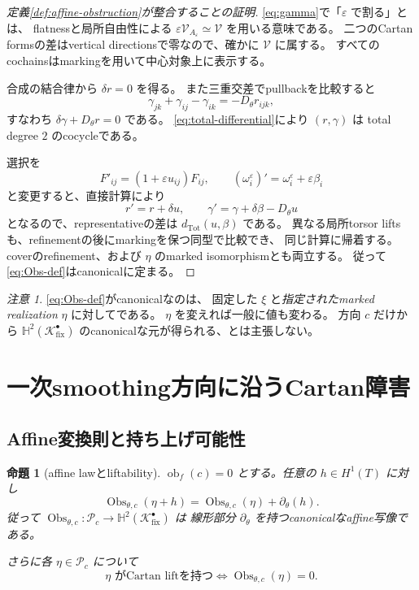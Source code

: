 \documentclass[uplatex,dvipdfmx,11pt]{jsarticle}
\numberwithin{equation}{section}
\theoremstyle{plain}
\newtheorem{proposition}[theorem]{命題}
\theoremstyle{definition}
\theoremstyle{remark}
\newtheorem{remark}[theorem]{注意}
\DeclareMathOperator{\Obs}{Obs}
\DeclareMathOperator{\obf}{ob}
\newcommand{\shV}{\mathcal V}
\newcommand{\Kfix}{\mathcal K_{\mathrm{fix}}^\bullet}
\newcommand{\Aeps}{A_\varepsilon}
\newcommand{\Hyp}{\mathbb H}
\begin{document}
\begin{proof}[定義\ref{def:affine-obstruction}が整合することの証明]
\eqref{eq:gamma}で「\(\varepsilon\) で割る」とは、
flatnessと局所自由性による \(\varepsilon\shV_{\Aeps}\simeq\shV\) を用いる意味である。
二つのCartan formsの差はvertical directionsで零なので、確かに \(\shV\) に属する。
すべてのcochainsはmarkingを用いて中心対象上に表示する。

合成の結合律から \(\delta r=0\) を得る。
また三重交差でpullbackを比較すると
\[
\gamma_{jk}+\gamma_{ij}-\gamma_{ik}=-D_\theta r_{ijk},
\]
すなわち \(\delta\gamma+D_\theta r=0\) である。
\eqref{eq:total-differential}により \((r,\gamma)\) は
total degree \(2\) のcocycleである。

選択を
\[
F'_{ij}=(1+\varepsilon u_{ij})F_{ij},
\qquad
(\omega_i^\varepsilon)'=\omega_i^\varepsilon+\varepsilon\beta_i
\]
と変更すると、直接計算により
\[
r'=r+\delta u,\qquad
\gamma'=\gamma+\delta\beta-D_\theta u
\]
となるので、representativeの差は \(d_{\mathrm{Tot}}(u,\beta)\) である。
異なる局所torsor liftsも、refinementの後にmarkingを保つ同型で比較でき、
同じ計算に帰着する。
coverのrefinement、および \(\eta\) のmarked isomorphismとも両立する。
従って\eqref{eq:Obs-def}はcanonicalに定まる。
\end{proof}

\begin{remark}
\label{rem:Obs-canonicity}
\eqref{eq:Obs-def}がcanonicalなのは、
固定した \(\xi\) と\emph{指定されたmarked realization} \(\eta\) に対してである。
\(\eta\) を変えれば一般に値も変わる。
方向 \(c\) だけから \(\Hyp^2(\Kfix)\) のcanonicalな元が得られる、とは主張しない。
\end{remark}

\section{一次smoothing方向に沿うCartan障害}
\label{sec:main-obstruction}

\subsection{Affine変換則と持ち上げ可能性}

\begin{proposition}[affine lawとliftability]
\label{prop:affine-law}
\(\obf_f(c)=0\) とする。任意の \(h\in H^1(T)\) に対し
\begin{equation}
\label{eq:affine-law}
\Obs_{\theta,c}(\eta+h)=\Obs_{\theta,c}(\eta)+\partial_\theta(h).
\end{equation}
従って \(\Obs_{\theta,c}:\mathcal P_c\to\Hyp^2(\Kfix)\) は
線形部分 \(\partial_\theta\) を持つcanonicalなaffine写像である。

さらに各 \(\eta\in\mathcal P_c\) について
\begin{equation}
\label{eq:liftability}
\eta\text{ がCartan liftを持つ}
\iff
\Obs_{\theta,c}(\eta)=0.
\end{equation}
\end{proposition}
\end{document}
